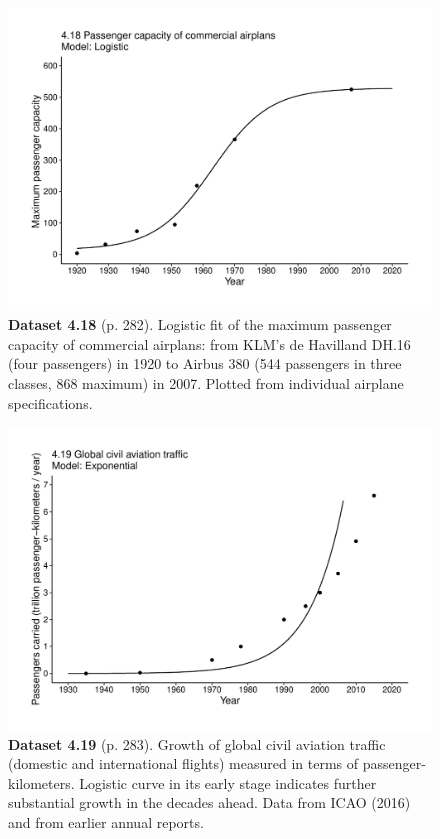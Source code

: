 \documentclass[aps,rmp,preprint,superscriptaddress,10pt,onecolumn]{article}
\begin{document}
\clearpage
\begin{figure}[h]
\includegraphics[width=\textwidth]{output/figs-ggplot/4.18.pdf}
\caption*{\textbf{Dataset 4.18} (p. 282). Logistic fit of the maximum passenger capacity of commercial airplans: from KLM's de Havilland DH.16 (four passengers) in 1920 to Airbus 380 (544 passengers in three classes, 868 maximum) in 2007. Plotted from individual airplane specifications.}
\end{figure}
	
\clearpage
\begin{figure}[h]
\includegraphics[width=\textwidth]{output/figs-ggplot/4.19.pdf}
\caption*{\textbf{Dataset 4.19} (p. 283). Growth of global civil aviation traffic (domestic and international flights) measured in terms of passenger-kilometers. Logistic curve in its early stage indicates further substantial growth in the decades ahead. Data from ICAO (2016) and from earlier annual reports. }
\end{figure}
	
\end{document}
